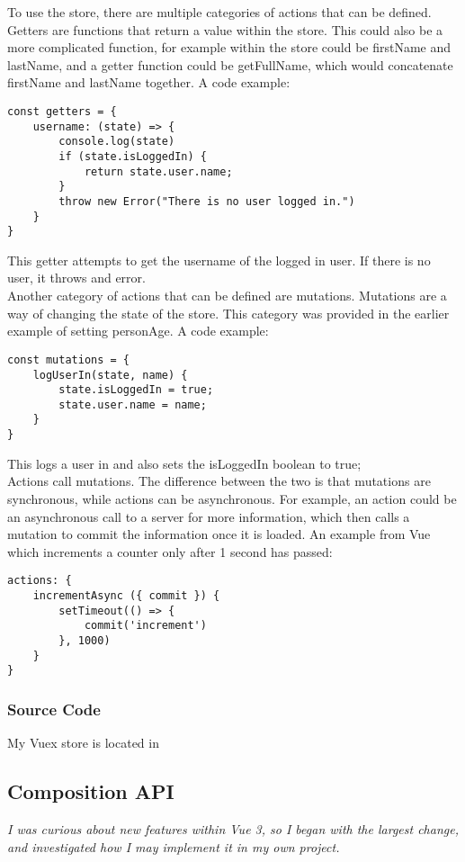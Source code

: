 \documentclass[portfolio.tex]{subfiles}
\begin{document}
			To use the store, there are multiple categories of actions that can be defined. Getters are functions that return a value within the store. This could also be a more complicated function, for example within the store could be firstName and lastName, and a getter function could be getFullName, which would concatenate firstName and lastName together. A code example:\\
			\begin{lstlisting}
const getters = {
	username: (state) => {
		console.log(state)
		if (state.isLoggedIn) {
			return state.user.name;
		}
		throw new Error("There is no user logged in.")
	}
}
			\end{lstlisting}
			\bigbreak
			This getter attempts to get the username of the logged in user. If there is no user, it throws and error. \\

			Another category of actions that can be defined are mutations. Mutations are a way of changing the state of the store. This category was provided in the earlier example of setting personAge. A code example:\\

			\begin{lstlisting}
const mutations = {
	logUserIn(state, name) {
		state.isLoggedIn = true;
		state.user.name = name;
	}
}
			\end{lstlisting}
			\bigbreak
			This logs a user in and also sets the isLoggedIn boolean to true;\\


			Actions call mutations. The difference between the two is that mutations are synchronous, while actions can be asynchronous. For example, an action could be an asynchronous call to a server for more information, which then calls a mutation to commit the information once it is loaded. An example from Vue which increments a counter only after 1 second has passed:\\

			\begin{lstlisting}
actions: {
	incrementAsync ({ commit }) {
		setTimeout(() => {
			commit('increment')
		}, 1000)
	}
}
			\end{lstlisting}
			\autocite{vuex}

			\subsubsection{Source Code}
				My Vuex store is located in

		\subsection{Composition API}
			\textit{I was curious about new features within Vue 3, so I began with the largest change, and investigated how I may implement it in my own project.}\\
\end{document}
